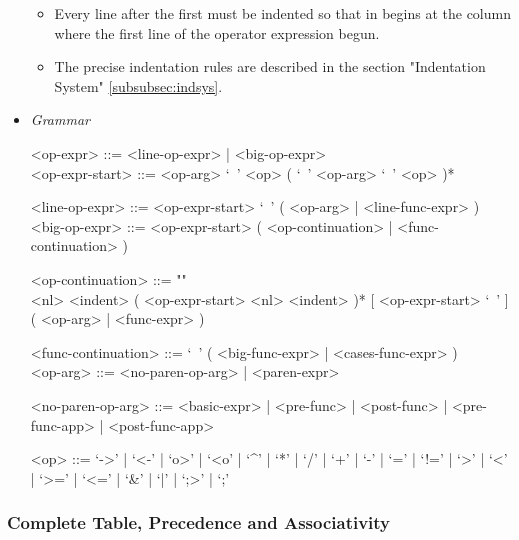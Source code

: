 \documentclass{article}
\begin{document}
\begin{itemize}
\begin{itemize}
\item
Every line after the first must be indented so that in begins at the column 
where the first line of the operator expression begun.

\item
The precise indentation rules are described in the section
"Indentation System" \ref{subsubsec:indsys}.
\end{itemize}

\item \textit{Grammar}
\begin{grammar}
<op-expr> ::= <line-op-expr> | <big-op-expr>
\\

<op-expr-start> ::= <op-arg> `\ ' <op> ( `\ ' <op-arg> `\ ' <op> )*

<line-op-expr> ::= <op-expr-start> `\ ' ( <op-arg> | <line-func-expr> )
\\

<big-op-expr> ::= 
<op-expr-start> ( <op-continuation> | <func-continuation> )

<op-continuation> ::= ""\\
<nl> <indent> ( <op-expr-start> <nl> <indent> )* 
[ <op-expr-start> `\ ' ] ( <op-arg> | <func-expr> )

<func-continuation> ::= 
`\ ' ( <big-func-expr> | <cases-func-expr> )
\\

<op-arg> ::= <no-paren-op-arg> | <paren-expr>

<no-paren-op-arg> ::=
<basic-expr> | <pre-func> | <post-func> | <pre-func-app> | <post-func-app>

<op> ::= 
`->' | `<-' | `o>' | `<o' | `^' | `*' | `/' | `+' | `-' |
`=' | `!=' | `>' | `<' | `>=' | `<=' | `\&' | `|' | `;>' | `;'\\
\end{grammar}
\end{itemize}

\newpage
\subsubsection{Complete Table, Precedence and Associativity}
\end{document}

